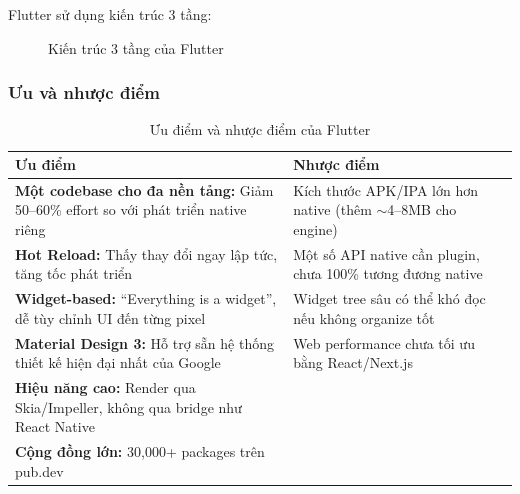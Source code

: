 Flutter sử dụng kiến trúc 3 tầng:

\begin{figure}[H]
\centering
{}
\caption{Kiến trúc 3 tầng của Flutter}
\label{fig:flutter-arch}
\end{figure}

\subsubsection{Ưu và nhược điểm}

\begin{table}[H]
\centering
\caption{Ưu điểm và nhược điểm của Flutter}
\begin{tabularx}{\textwidth}{|X|X|}
\hline
\textbf{Ưu điểm} & \textbf{Nhược điểm} \\
\hline
\textbf{Một codebase cho đa nền tảng:} Giảm 50--60\% effort so với phát triển native riêng & Kích thước APK/IPA lớn hơn native (thêm $\sim$4--8MB cho engine) \\
\hline
\textbf{Hot Reload:} Thấy thay đổi ngay lập tức, tăng tốc phát triển & Một số API native cần plugin, chưa 100\% tương đương native \\
\hline
\textbf{Widget-based:} ``Everything is a widget'', dễ tùy chỉnh UI đến từng pixel & Widget tree sâu có thể khó đọc nếu không organize tốt \\
\hline
\textbf{Material Design 3:} Hỗ trợ sẵn hệ thống thiết kế hiện đại nhất của Google & Web performance chưa tối ưu bằng React/Next.js \\
\hline
\textbf{Hiệu năng cao:} Render qua Skia/Impeller, không qua bridge như React Native & \\
\hline
\textbf{Cộng đồng lớn:} 30,000+ packages trên pub.dev & \\
\hline
\end{tabularx}
\end{table}

